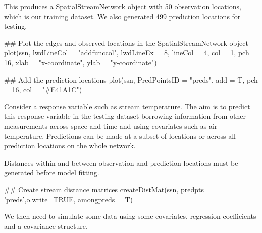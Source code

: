 This produces a SpatialStreamNetwork object with 50 observation locations, which is our training dataset. We also generated 499 prediction locations for testing. 

\begin{example}
## Plot the edges and observed locations in the SpatialStreamNetwork object
plot(ssn, lwdLineCol = "addfunccol",  lwdLineEx = 8,
     lineCol = 4,  col = 1,  pch = 16,  xlab = "x-coordinate",  ylab = "y-coordinate")
\end{example}

\begin{example}
## Add the prediction locations
plot(ssn, PredPointsID = "preds", add = T, pch = 16, col = "#E41A1C")
\end{example}

Consider a response variable such as stream temperature. 
The aim is to predict this response variable in the testing dataset borrowing information from other measurements across space and time and using covariates such as air temperature. Predictions can be made at a subset of locations or across all prediction locations on the whole network.

Distances within and between observation and prediction locations must be generated before model fitting. 

\begin{example}
## Create stream distance matrices
createDistMat(ssn, predpts = 'preds',o.write=TRUE, amongpreds = T)
\end{example}

We then need to simulate some data using some covariates, regression coefficients and a covariance structure.

